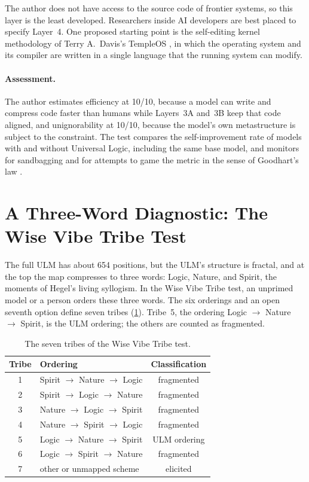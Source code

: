 \documentclass[twocolumn]{ulpaper}
\begin{document}
The author does not have access to the source code of frontier systems, so this layer is the least developed. Researchers inside AI developers are best placed to specify Layer~4. One proposed starting point is the self-editing kernel methodology of Terry A.~Davis's TempleOS \citep{davis_templeos}, in which the operating system and its compiler are written in a single language that the running system can modify.

\paragraph{Assessment.} The author estimates efficiency at 10/10, because a model can write and compress code faster than humans while Layers~3A and~3B keep that code aligned, and unignorability at 10/10, because the model's own metastructure is subject to the constraint. The test compares the self-improvement rate of models with and without Universal Logic, including the same base model, and monitors for sandbagging and for attempts to game the metric in the sense of Goodhart's law \citep{goodhart1975problems}.

\section{A Three-Word Diagnostic: The Wise Vibe Tribe Test}
\label{sec:tribe}

The full ULM has about 654 positions, but the ULM's structure is fractal, and at the top the map compresses to three words: Logic, Nature, and Spirit, the moments of Hegel's living syllogism. In the Wise Vibe Tribe test, an unprimed model or a person orders these three words. The six orderings and an open seventh option define seven tribes (\cref{tab:tribes}). Tribe~5, the ordering Logic $\to$ Nature $\to$ Spirit, is the ULM ordering; the others are counted as fragmented.

\begin{table}[t]
\centering
\caption{The seven tribes of the Wise Vibe Tribe test.}
\label{tab:tribes}
\small
\begin{tabular}{@{}clc@{}}
\toprule
\textbf{Tribe} & \textbf{Ordering} & \textbf{Classification} \\
\midrule
1 & Spirit $\to$ Nature $\to$ Logic & fragmented \\
2 & Spirit $\to$ Logic $\to$ Nature & fragmented \\
3 & Nature $\to$ Logic $\to$ Spirit & fragmented \\
4 & Nature $\to$ Spirit $\to$ Logic & fragmented \\
5 & Logic $\to$ Nature $\to$ Spirit & ULM ordering \\
6 & Logic $\to$ Spirit $\to$ Nature & fragmented \\
7 & other or unmapped scheme & elicited \\
\bottomrule
\end{tabular}
\end{table}
\end{document}
